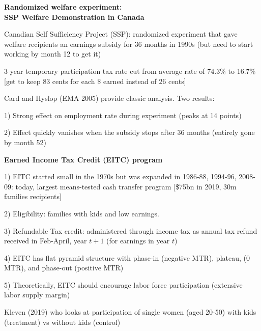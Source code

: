 \documentclass[landscape]{slides}
\begin{document}
\begin{slide}
\begin{center}
{\bf Randomized welfare experiment: \\SSP Welfare Demonstration in Canada}
\end{center}

Canadian Self Sufficiency Project (SSP):
randomized experiment that gave welfare recipients an earnings subsidy for 36 months in 1990s
(but need to start working by month 12 to get it)

3 year temporary participation tax rate cut from average rate of 74.3\% to 16.7\%
[get to keep 83 cents for each \$ earned instead of 26 cents]


Card and Hyslop (EMA 2005) provide classic analysis. Two results:

1) Strong effect on employment rate during experiment (peaks at 14 points)

2) Effect quickly vanishes when the subsidy stops after 36 months (entirely gone by month 52)

\end{slide}


\begin{slide}

\end{slide}



\begin{slide}
\begin{center}
{\bf Earned Income Tax Credit (EITC) program}
\end{center}

1) EITC started small in the 1970s but was expanded in 1986-88,
1994-96, 2008-09: today, largest means-tested cash transfer
program [\$75bn in 2019, 30m families recipients]

2) Eligibility: families with kids and low earnings.

3) Refundable Tax credit: administered through income tax as
annual tax refund received in Feb-April, year $t+1$ (for earnings
in year $t$)

4) EITC has flat pyramid structure with phase-in (negative MTR),
plateau, (0 MTR), and phase-out (positive MTR)

5) Theoretically, EITC should encourage labor force participation
(extensive labor supply margin)

Kleven (2019) who looks at participation of single women (aged 20-50)
with kids (treatment) vs without kids (control)

\end{slide}
\end{document}
